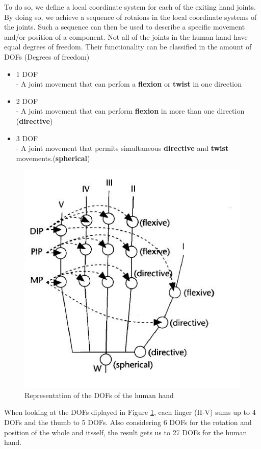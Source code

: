 To do so, we define a local coordinate system for each of the exiting hand joints. By doing so, we achieve a sequence of rotaions in the local coordinate systems of the joints. Such a sequence can then be used to describe a specific movement and/or position of a component.
Not all of the joints in the human hand have equal degrees of freedom. Their functionality can be classified in the amount of DOFs (Degrees of freedom)\cite{KOREIN.1985}
\begin{itemize}
\item 1 DOF \\
	- A joint movement that can perfom a \textbf{flexion} or \textbf{twist} in one direction
\item 2 DOF \\
	- A joint movement that can perform \textbf{flexion} in more than one direction (\textbf{directive})
\item 3 DOF\\
	- A joint movement that permits simultaneous \textbf{directive} and \textbf{twist} movements.(\textbf{spherical})
\end{itemize}
\begin{figure}[H]
\includegraphics[scale=0.8]{images/Hand_DOFs.JPG} 
\caption{Representation of the DOFs of the human hand}
\label{dof_image} 
\end{figure}
When looking at the DOFs diplayed in Figure \ref{dof_image}, each finger (II-V) sums up to 4 DOFs and the thumb to 5 DOFs. Also considering 6 DOFs for the rotation and position of the whole and itsself, the result gets us to 27 DOFs  for the human hand.
